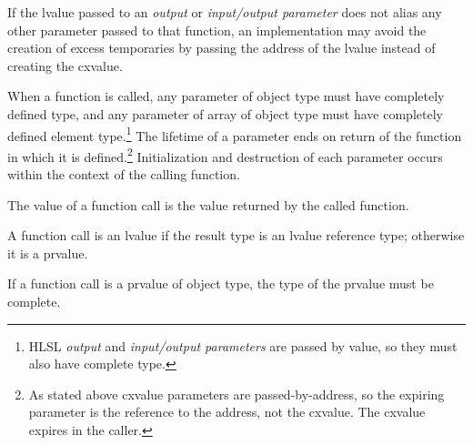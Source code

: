 \p If the lvalue passed to an \textit{output} or \textit{input/output parameter}
does not alias any other parameter passed to that function, an implementation
may avoid the creation of excess temporaries by passing the address of the
lvalue instead of creating the cxvalue.

\p When a function is called, any parameter of object type must have completely
defined type, and any parameter of array of object type must have completely
defined element type.\footnote{HLSL \textit{output} and \textit{input/output
parameters} are passed by value, so they must also have complete type.} The
lifetime of a parameter ends on return of the function in which it is
defined.\footnote{As stated above cxvalue parameters are passed-by-address, so
the expiring parameter is the reference to the address, not the cxvalue. The
cxvalue expires in the caller.} Initialization and destruction of each
parameter occurs within the context of the calling function.

\p The value of a function call is the value returned by the called function.

\p A function call is an lvalue if the result type is an lvalue reference type;
otherwise it is a prvalue.

\p If a function call is a prvalue of object type, the type of the prvalue must
be complete.
